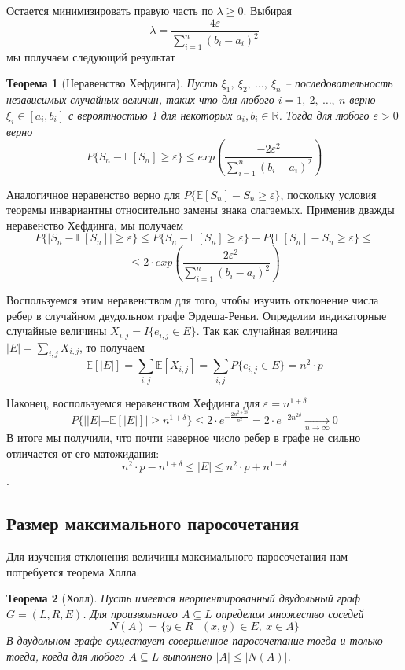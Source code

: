\documentclass[a4paper]{article}
\newtheorem*{mtheorem}{Теорема}
\begin{document}
Остается минимизировать правую часть по $\lambda \geq 0$. Выбирая $$\lambda = \frac{4\varepsilon}{\sum\limits_{i=1}^n(b_i-a_i)^2}$$ 
мы получаем следующий результат 
\begin{mtheorem}[Неравенство Хефдинга]
    Пусть $\xi_1,\ \xi_2,\ \dots,\ \xi_n$ -- последовательность независимых случайных величин, таких что 
для любого $i = 1,\ 2,\ \ldots,\ n$ верно $\xi_i \in [a_i, b_i]$ с вероятностью 1 для некоторых 
$a_i, b_i \in \mathbb{R}$. Тогда для любого $\varepsilon > 0$ верно $$P\{S_n - \mathbb{E}[S_n]\geq 
\varepsilon\} \leq exp\left(\frac{-2\varepsilon^2}{\sum\limits_{i=1}^n(b_i - a_i)^2}\right)$$
\end{mtheorem}

Аналогичное неравенство верно для $P\{\mathbb{E}[S_n] - S_n\geq \varepsilon\}$, поскольку условия теоремы 
инвариантны относительно замены знака слагаемых. Применив дважды неравенство Хефдинга, мы получаем 
$$P\{|S_n - \mathbb{E}[S_n]|\geq \varepsilon\} \leq P\{S_n - \mathbb{E}[S_n]\geq \varepsilon\} + 
P\{\mathbb{E}[S_n] - S_n\geq \varepsilon\} \leq $$ $$\leq 2\cdot exp\left(\frac{-2\varepsilon^2}{\sum\limits_{i=1}^n(b_i - a_i)^2}\right)$$

Воспользуемся этим неравенством для того, чтобы изучить отклонение числа ребер в случайном двудольном 
графе Эрдеша-Реньи. Определим индикаторные случайные величины $X_{i, j} = I\{e_{i,j}\in E\}$. Так как случайная 
величина $|E| = \sum\limits_{i,j}X_{i,j}$, то получаем $$\mathbb{E}[|E|] = \sum\limits_{i,j}\mathbb{E}[X_{i,j}] = 
\sum\limits_{i,j}P\{e_{i,j}\in E\} = n^2\cdot p$$

Наконец, воспользуемся неравенством Хефдинга для $\varepsilon = n^{1+\delta}$ $$ P\{||E| - \mathbb{E}[|E|]| \geq
n^{1+\delta}\} \leq 2\cdot e^{-\frac{2n^{2+2\delta}}{n^2}} = 2\cdot e^{-2n^{2\delta}} \xrightarrow[n \to \infty]{} 0 $$ 
В итоге мы получили, что почти наверное число ребер в графе не сильно отличается от его матожидания: 
$$n^2\cdot p - n^{1+\delta} \leq |E| \leq n^2\cdot p + n^{1+\delta}$$.


\subsection{Размер максимального паросочетания}

Для изучения отклонения величины максимального паросочетания нам потребуется теорема Холла.
\begin{mtheorem}[{Холл}]
    Пусть имеется неориентированный двудольный граф $G = (L, R, E)$. Для произвольного $A \subseteq L$ 
    определим множество соседей  $$N(A) = \{y\in R\ |\ (x, y) \in E,\ x\in A\}$$ В двудольном графе существует 
    совершенное паросочетание тогда и только тогда, когда для любого $A \subseteq L$ выполнено $|A| \leq |N(A)|$.
\end{mtheorem}
\end{document}
